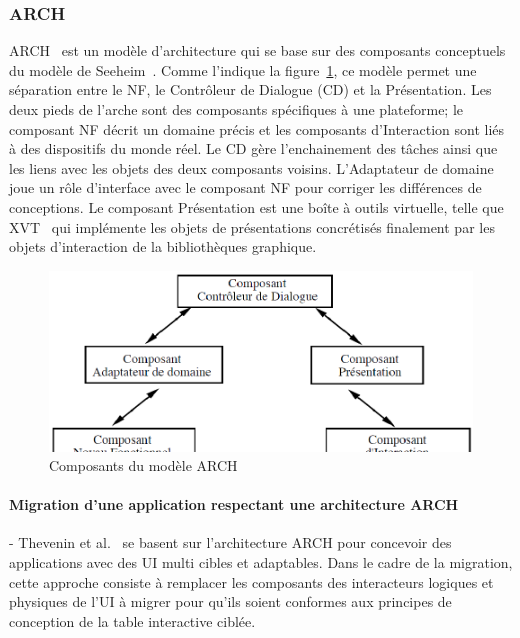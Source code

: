 \subsubsection{ARCH}
ARCH~\cite{UIMS1992} est un modèle d'architecture qui se base sur des composants conceptuels du modèle de Seeheim~\cite{Pfaff1985}. Comme l'indique la figure~\ref{fig:chap2:5}, ce modèle permet une séparation entre le NF, le Contrôleur de Dialogue (CD) et la Présentation. Les deux pieds de l'arche sont des composants spécifiques à une plateforme; le composant NF décrit un domaine précis et les composants d'Interaction sont liés à des dispositifs du monde réel. Le CD gère l'enchainement des tâches ainsi que les liens avec les objets des deux composants voisins. L'Adaptateur de domaine joue un rôle d'interface avec le composant NF pour corriger les différences de conceptions. Le composant Présentation est une boîte à outils virtuelle, telle que XVT~\cite{Valdes1989} qui implémente les objets de présentations concrétisés finalement par les objets d'interaction de la bibliothèques graphique. 
\begin{figure}[h]
\begin{center}
\includegraphics[width=340pt]{chap2/img-7}
\caption{Composants du modèle ARCH}\label{fig:chap2:5}
\end{center}
\end{figure}

\paragraph{Migration d'une application respectant une architecture ARCH}-
Thevenin et al.~\cite{Thevenin2002} se basent sur l'architecture ARCH pour concevoir des applications avec des UI multi cibles et adaptables. Dans le cadre de la migration, cette approche consiste à remplacer les composants des interacteurs logiques et physiques de l'UI à migrer pour qu'ils soient conformes aux principes de conception de la table interactive ciblée.

